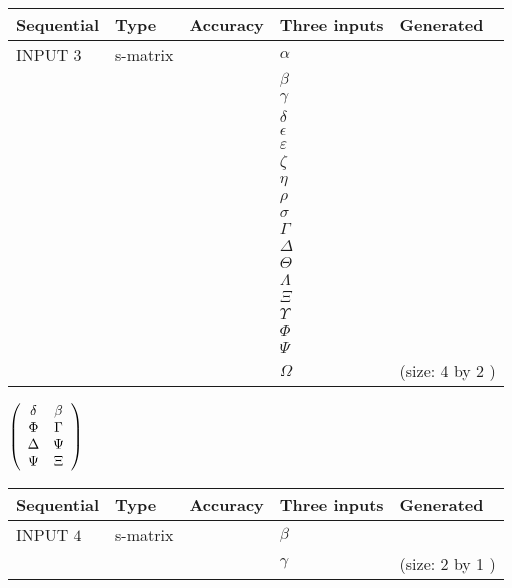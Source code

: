 \documentclass[12pt]{article}
\begin{document}
  
\noindent\begin{tabular}{|l|l|l|l|l|}
\hline
 Sequential & Type & Accuracy & Three inputs & Generated \\ 
\hline
 
 
  INPUT $            3 $ & s-matrix & & 
 $  \alpha $ & 
  \\
  & & & 
 $  \beta $ & 
  \\
  & & & 
 $  \gamma $ & 
  \\
  & & & 
 $  \delta $ & 
  \\
  & & & 
 $  \epsilon $ & 
  \\
  & & & 
 $  \varepsilon $ & 
  \\
  & & & 
 $                     \zeta $ & 
  \\
  & & & 
 $  \eta $ & 
  \\
  & & & 
 $  \rho $ & 
  \\
  & & & 
 $  \sigma $ & 
  \\
  & & & 
 $  \Gamma $ & 
  \\
  & & & 
 $  \Delta $ & 
  \\
  & & & 
 $  \Theta $ & 
  \\
  & & & 
 $  \Lambda $ & 
  \\
  & & & 
 $                     \Xi $ & 
  \\
  & & & 
 $  \Upsilon $ & 
  \\
  & & & 
 $  \Phi $ & 
  \\
  & & & 
 $  \Psi $ & 
  \\
  & & & 
 $  \Omega $ & 
  (size:            4  by            2 )
 \\  \hline  
 \end{tabular}
   
   
 $  \left( \begin{array}
 {
 c
 c
 }
 \delta & 
 \beta \\ 
 \Phi & 
 \Gamma \\ 
 \Delta & 
 \Psi \\ 
 \Psi & 
                    \Xi
 \end{array} \right) $ 
  
  
\noindent\begin{tabular}{|l|l|l|l|l|}
\hline
 Sequential & Type & Accuracy & Three inputs & Generated \\ 
\hline
 
 
  INPUT $            4 $ & s-matrix & & 
 $  \beta $ & 
  \\
  & & & 
 $  \gamma $ & 
  (size:            2  by            1 )
 \\  \hline  
 \end{tabular}
   
\end{document}
